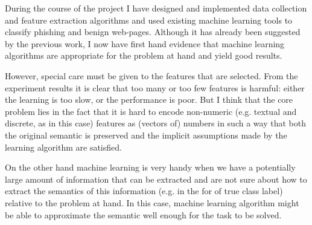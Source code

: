 \documentclass{article}
\begin{document}
During the course of the project I have designed and implemented data
collection and feature extraction algorithms and used existing machine
learning tools to classify phishing and benign web-pages. Although it
has already been suggested by the previous work, I now have first hand
evidence that machine learning algorithms are appropriate for the
problem at hand and yield good results. 

However, special care must be given to the features that are
selected. From the experiment results it is clear that too many or too
few features is harmful: either the learning is too slow, or the
performance is poor. But I think that the core problem lies in the
fact that it is hard to encode non-numeric (e.g. textual and discrete,
as in this case) features as (vectors of) numbers in such a way that
both the original semantic is preserved and the implicit assumptions
made by the learning algorithm are satisfied. 

On the other hand machine learning is very handy when we have a
potentially large amount of information that can be extracted and are
not sure about how to extract the semantics of this information
(e.g. in the for of true class label) relative to the problem at
hand. In this case, machine learning algorithm might be able to
approximate the semantic well enough for the task to be solved.



\end{document}
